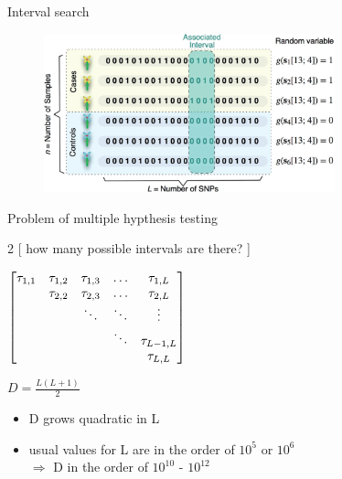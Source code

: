 \documentclass[aspectratio=32, 10pt]{beamer}
\begin{document}
\begin{frame}{Interval search}

\begin{figure}
    \centering
    \includegraphics[width=0.75\textwidth]{figures/interval.png}
\end{figure}

\end{frame}

\begin{frame}[fragile]{Problem of multiple hypthesis testing}

\begin{multicols}{2}
[
{\large how many possible intervals are there?}
\vspace{10pt}
]

\vspace{10pt} 
\begin{math}
\begin{bmatrix}
\centering
\tau_{1,1} & \tau_{1,2} & \tau_{1,3} & \ldots &\tau_{1,L}\\
& \tau_{2,2} &\tau_{2,3} & \ldots & \tau_{2,L}\\
&& \ddots & \ddots & \vdots \\
&&&\ddots &\tau_{L-1,L}\\
&&&& \tau_{L,L}
\end{bmatrix}
\end{math}

\vspace{12pt}
\hspace{3ex}
{\centering \large $D = \frac{L (L+1)}{2}$}
\begin{itemize}
    \item D grows quadratic in L
    \item usual values for L are in the order of $10^5$ or $10^6$ \\
    $\Rightarrow$ D in the order of $10^{10}$ - $10^{12}$
\end{itemize}
\end{multicols}
\end{frame}
\end{document}

